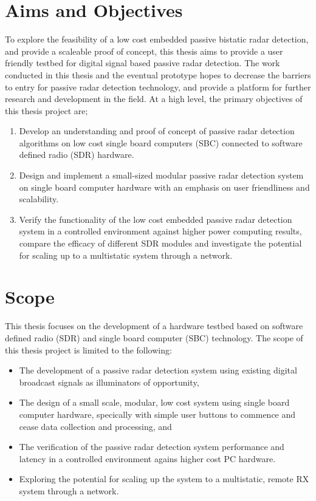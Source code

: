 \section{Aims and Objectives \label{sec:aims}}
To explore the feasibility of a low cost embedded passive bistatic radar detection, and provide a scaleable proof of concept, this thesis aims to provide a user friendly testbed for digital signal based passive radar detection. The work conducted in this thesis and the eventual prototype hopes to decrease the barriers to entry for passive radar detection technology, and provide a platform for further research and development in the field. At a high level, the primary objectives of this thesis project are;
\begin{enumerate}
    \item Develop an understanding and proof of concept of passive radar detection algorithms on low cost single board computers (SBC) connected to software defined radio (SDR) hardware.
    \item Design and implement a small-sized modular passive radar detection system on single board computer hardware with an emphasis on user friendliness and scalability.
    \item Verify the functionality of the low cost embedded passive radar detection system in a controlled environment against higher power computing results, compare the efficacy of different SDR modules and investigate the potential for scaling up to a multistatic system through a network. 
\end{enumerate}

\section{Scope \label{sec:thesisScope}}
This thesis focuses on the development of a hardware testbed based on software defined radio (SDR) and single board computer (SBC) technology. The scope of this thesis project is limited to the following:

\begin{itemize}
    \item The development of a passive radar detection system using existing digital broadcast signals as illuminators of opportunity,
    \item The design of a small scale, modular, low cost system using single board computer hardware, specically with simple user buttons to commence and cease data collection and processing, and 
    \item The verification of the passive radar detection system performance and latency in a controlled environment agains higher cost PC hardware.
    \item Exploring the potential for scaling up the system to a multistatic, remote RX system through a network.
\end{itemize}

